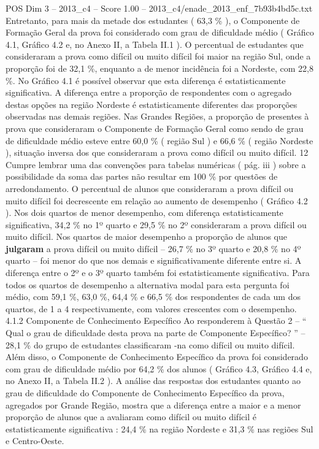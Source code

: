 \begin{textsample}{POS Dim 3 – 2013\_c4 – Score 1.00 – 2013\_c4/enade\_2013\_enf\_7b93b4bd5c.txt}
Entretanto, para mais da metade dos estudantes ( 63,3 \% ), o Componente de Formação Geral da prova foi considerado com grau de dificuldade médio ( Gráfico 4.1, Gráfico 4.2 e, no Anexo II, a Tabela II.1 ).
O percentual de estudantes que consideraram a prova como difícil ou muito difícil foi maior na região Sul, onde a proporção foi de 32,1 \%, enquanto a de menor incidência foi a Nordeste, com 22,8 \%.
No Gráfico 4.1 é possível observar que esta diferença é estatisticamente significativa.
A diferença entre a proporção de respondentes com o agregado destas opções na região Nordeste é estatisticamente diferentes das proporções observadas nas demais regiões.
Nas Grandes Regiões, a proporção de presentes à prova que consideraram o Componente de Formação Geral como sendo de grau de dificuldade médio esteve entre 60,0 \% ( região Sul ) e 66,6 \% ( região Nordeste ), situação inversa dos que consideraram a prova como difícil ou muito difícil. 12 Cumpre lembrar uma das convenções para tabelas numéricas ( pág. iii ) sobre a possibilidade da soma das partes não resultar em 100 \% por questões de arredondamento.
O percentual de alunos que consideraram a prova difícil ou muito difícil foi decrescente em relação ao aumento de desempenho ( Gráfico 4.2 ).
Nos dois quartos de menor desempenho, com diferença estatisticamente significativa, 34,2 \% no 1º quarto e 29,5 \% no 2º consideraram a prova difícil ou muito difícil.
Nos quartos de maior desempenho a proporção de alunos que \textbf{julgaram} a prova difícil ou muito difícil – 26,7 \% no 3º quarto e 20,8 \% no 4º quarto – foi menor do que nos demais e significativamente diferente entre si.
A diferença entre o 2º e o 3º quarto também foi estatisticamente significativa.
Para todos os quartos de desempenho a alternativa modal para esta pergunta foi médio, com 59,1 \%, 63,0 \%, 64,4 \% e 66,5 \% dos respondentes de cada um dos quartos, de 1 a 4 respectivamente, com valores crescentes com o desempenho. 4.1.2 Componente de Conhecimento Específico Ao responderem à Questão 2 – “ Qual o grau de dificuldade desta prova na parte de Componente Específico? ” – 28,1 \% do grupo de estudantes classificaram -na como difícil ou muito difícil.
Além disso, o Componente de Conhecimento Específico da prova foi considerado com grau de dificuldade médio por 64,2 \% dos alunos ( Gráfico 4.3, Gráfico 4.4 e, no Anexo II, a Tabela II.2 ).
A análise das respostas dos estudantes quanto ao grau de dificuldade do Componente de Conhecimento Específico da prova, agregados por Grande Região, mostra que a diferença entre a maior e a menor proporção de alunos que a avaliaram como difícil ou muito difícil é estatisticamente significativa : 24,4 \% na região Nordeste e 31,3 \% nas regiões Sul e Centro-Oeste.

\end{textsample}

